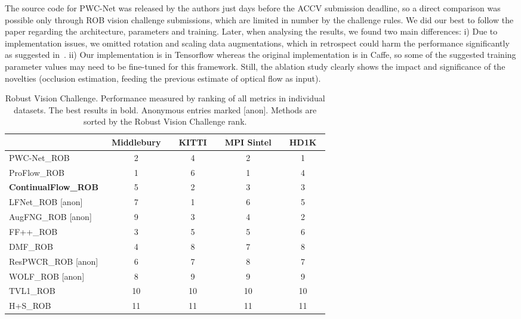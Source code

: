 \documentclass[runningheads]{llncs}
\begin{document}
The source code for PWC-Net was released by the authors just days before the ACCV submission deadline, so
a direct comparison was possible only through ROB vision challenge submissions, which are limited in number by the challenge rules. 
We did our best to follow the paper regarding the architecture, parameters and training. 
Later, when analysing the results, we found two main differences: 
i) Due to implementation issues, we omitted rotation and scaling data augmentations, which in retrospect could harm the performance significantly as suggested in~\cite{Mayer2018}.
ii) Our implementation is in Tensorflow whereas the original implementation is in Caffe, so some of the suggested training parameter values may need to be fine-tuned for this framework. 
Still, the ablation study clearly shows the impact and significance of the novelties (occlusion estimation, feeding the previous estimate of optical flow as input).

\begin{table}[tb]
\caption{Robust Vision Challenge.
Performance measured by ranking of all metrics in individual datasets.
The best results in bold.
Anonymous entries marked {[}anon{]}.
Methods are sorted by the Robust Vision Challenge rank.
}
\label{tab:comparison_rob}
\centering
\begin{adjustbox}{max width=\textwidth}
\begin{tabular}{l|cccc}
 & \multicolumn{1}{c}{~Middlebury~} & \multicolumn{1}{c}{~KITTI~} & \multicolumn{1}{c}{~MPI Sintel~} & \multicolumn{1}{c}{~HD1K~} \\ \hline
PWC-Net\_ROB~\cite{Sun2017} & 2 & 4 & 2 & 1 \\
ProFlow\_ROB~\cite{Maurer2018}& 1 & 6 & 1 & 4 \\
\textbf{ContinualFlow\_ROB} & 5 & 2 & 3 & 3 \\
LFNet\_ROB {[}anon{]}& 7 & 1 & 6 & 5 \\
AugFNG\_ROB {[}anon{]} & 9 & 3 & 4 & 2 \\
FF++\_ROB~\cite{Schuster2018a} & 3 & 5 & 5 & 6 \\
DMF\_ROB~\cite{Weinzaepfel2013} & 4 & 8 & 7 & 8 \\
ResPWCR\_ROB {[}anon{]} & 6 & 7 & 8 & 7 \\
WOLF\_ROB {[}anon{]} & 8 & 9 & 9 & 9 \\
TVL1\_ROB~\cite{Perez2013} & 10 & 10 & 10 & 10 \\
H+S\_ROB~\cite{Horn1981} & 11 & 11 & 11 & 11
\end{tabular}
\end{adjustbox}
\end{table}
\end{document}
